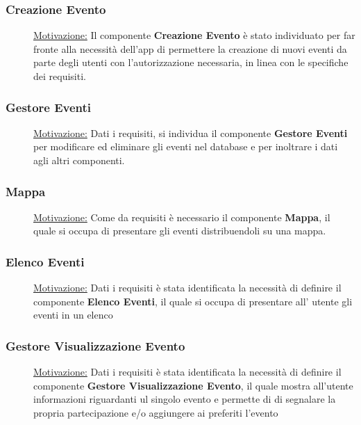 \documentclass{article}
\begin{document}
\subsubsection{Creazione Evento}
\begin{description}
    \item[] \underline{Motivazione:}
        Il componente \textbf{Creazione Evento} è stato individuato per far fronte alla necessità dell'app di permettere la creazione di nuovi eventi da parte degli utenti con l'autorizzazione necessaria, in linea con le specifiche dei requisiti.
\end{description}
\subsubsection{Gestore Eventi}
\begin{description}
    \item[] \underline{Motivazione:} Dati i requisiti, si individua il componente \textbf{Gestore Eventi} per modificare ed eliminare gli eventi nel database e per inoltrare i dati agli altri componenti.
\end{description}
\subsubsection{Mappa}
\begin{description}
    \item[] \underline{Motivazione:}
        Come da requisiti è necessario il componente \textbf{Mappa}, il quale si occupa di presentare gli eventi distribuendoli su una mappa.
\end{description}
\subsubsection{Elenco Eventi}
\begin{description}
    \item[] \underline{Motivazione:}
        Dati i requisiti è stata identificata la necessità di definire il componente \textbf{Elenco Eventi}, il quale si occupa di presentare all' utente gli eventi in un elenco
\end{description}
\subsubsection{Gestore Visualizzazione Evento}
\begin{description}
    \item[] \underline{Motivazione:}
        Dati i requisiti è stata identificata la necessità di definire il componente \textbf{Gestore Visualizzazione Evento}, il quale mostra all'utente informazioni riguardanti ul singolo evento e permette di di segnalare la propria partecipazione e/o aggiungere ai preferiti l'evento
\end{description}
\end{document}
